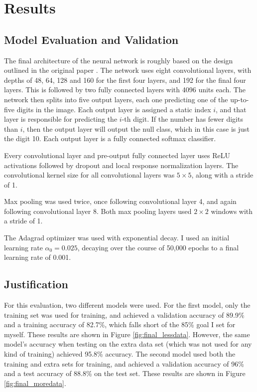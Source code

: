 \documentclass[12pt]{article}
\begin{document}
\section{Results}
\subsection{Model Evaluation and Validation} \label{sssec:evaluation}
The final architecture of the neural network is roughly based on the design outlined in the original paper \cite{svhn_original_paper}.
The network uses eight convolutional layers, with depths of 48, 64, 128 and 160 for the first four layers, and 192 for the final four layers.
This is followed by two fully connected layers with 4096 units each.
The network then splits into five output layers, each one predicting one of the up-to-five digits in the image. 
Each output layer is assigned a static index $i$, and that layer is responsible for predicting the $i$-th digit. 
If the number has fewer digits than $i$, then the output layer will output the null class, which in this case is just the digit 10.
Each output layer is a fully connected softmax classifier.

Every convolutional layer and pre-output fully connected layer uses ReLU\cite{relu} activations followed by dropout\cite{svhn_dropout} and local response normalization\cite{svhn_lrn} layers.
The convolutional kernel size for all convolutional layers was $5 \times 5$, along with a stride of 1.

Max pooling was used twice, once following convolutional layer 4, and again following convolutional layer 8.
Both max pooling layers used $2 \times 2$ windows with a stride of 1.

The Adagrad optimizer was used with exponential decay. I used an initial learning rate $\alpha_0 = 0.025$, decaying over the course of 50,000 epochs to a final learning rate of 0.001.

\subsection{Justification} \label{sssec:justification}
For this evaluation, two different models were used.
For the first model, only the training set was used for training, and achieved a validation accuracy of 89.9\% and a training accuracy of 82.7\%, which falls short of the 85\% goal I set for myself.
These results are shown in Figure \ref{fig:final_lessdata}.
However, the same model's accuracy when testing on the extra data set (which was not used for any kind of training) achieved 95.8\% accuracy.
The second model used both the training and extra sets for training, and achieved a validation accuracy of 96\% and a test accuracy of 88.8\% on the test set.
These results are shown in Figure \ref{fig:final_moredata}.
\end{document}
